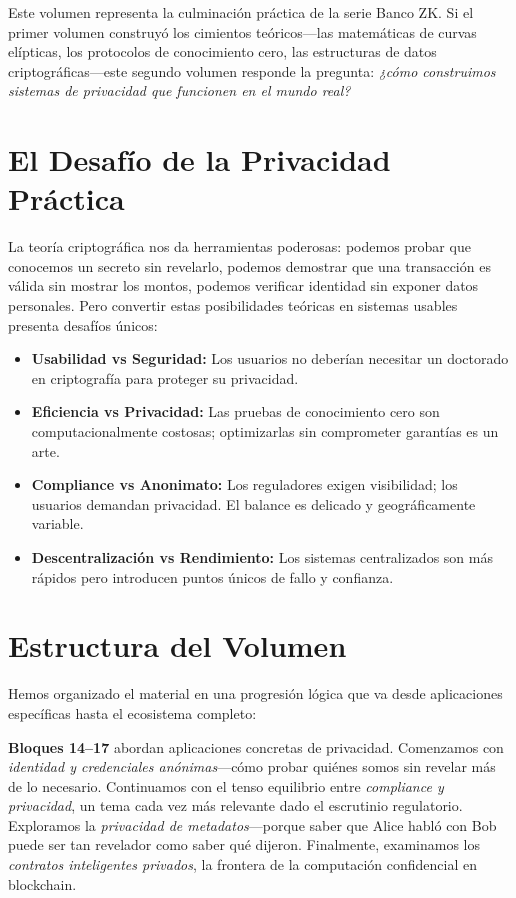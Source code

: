 \documentclass[11pt,a4paper,twoside]{book}
\theoremstyle{definition}
\theoremstyle{remark}
\begin{document}
Este volumen representa la culminación práctica de la serie Banco ZK. Si el primer volumen construyó los cimientos teóricos---las matemáticas de curvas elípticas, los protocolos de conocimiento cero, las estructuras de datos criptográficas---este segundo volumen responde la pregunta: \textit{¿cómo construimos sistemas de privacidad que funcionen en el mundo real?}

\section*{El Desafío de la Privacidad Práctica}

La teoría criptográfica nos da herramientas poderosas: podemos probar que conocemos un secreto sin revelarlo, podemos demostrar que una transacción es válida sin mostrar los montos, podemos verificar identidad sin exponer datos personales. Pero convertir estas posibilidades teóricas en sistemas usables presenta desafíos únicos:

\begin{itemize}
    \item \textbf{Usabilidad vs Seguridad:} Los usuarios no deberían necesitar un doctorado en criptografía para proteger su privacidad.
    
    \item \textbf{Eficiencia vs Privacidad:} Las pruebas de conocimiento cero son computacionalmente costosas; optimizarlas sin comprometer garantías es un arte.
    
    \item \textbf{Compliance vs Anonimato:} Los reguladores exigen visibilidad; los usuarios demandan privacidad. El balance es delicado y geográficamente variable.
    
    \item \textbf{Descentralización vs Rendimiento:} Los sistemas centralizados son más rápidos pero introducen puntos únicos de fallo y confianza.
\end{itemize}

\section*{Estructura del Volumen}

Hemos organizado el material en una progresión lógica que va desde aplicaciones específicas hasta el ecosistema completo:

\textbf{Bloques 14--17} abordan aplicaciones concretas de privacidad. Comenzamos con \textit{identidad y credenciales anónimas}---cómo probar quiénes somos sin revelar más de lo necesario. Continuamos con el tenso equilibrio entre \textit{compliance y privacidad}, un tema cada vez más relevante dado el escrutinio regulatorio. Exploramos la \textit{privacidad de metadatos}---porque saber que Alice habló con Bob puede ser tan revelador como saber qué dijeron. Finalmente, examinamos los \textit{contratos inteligentes privados}, la frontera de la computación confidencial en blockchain.
\end{document}
